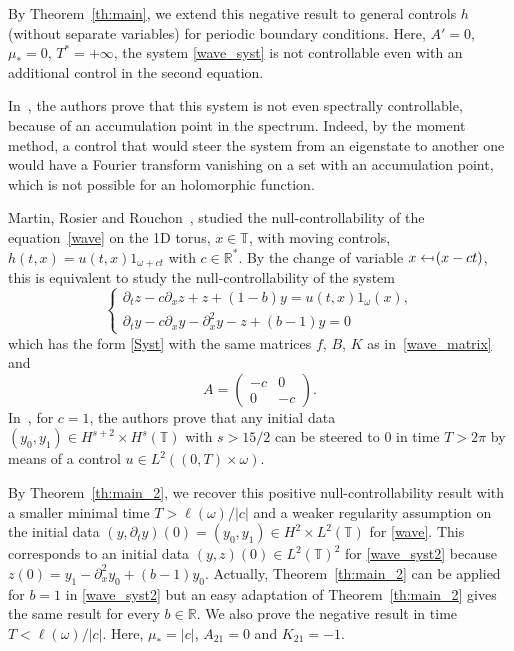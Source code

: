 \documentclass[10pt]{amsart}
\def\from{\mathchoice{\longleftarrow}{\leftarrow}{\leftarrow}{\leftarrow}}
\def\mfrom{\mathrel{\from\joinrel\mapstochar}}
\theoremstyle{plain}
\theoremstyle{definition}
\theoremstyle{remark}
\newcommand{\set}{\mathbb}
\newcommand{\R}{} %
\renewcommand{\R}{\set{R}}
\newcommand{\T}{\set{T}}
\begin{document}
By Theorem~\ref{th:main}, we extend this negative result to general controls $h$ (\ie without separate variables) for periodic boundary conditions.
Here, $A'=0$, $\mu_*=0$, $T^\ast=+\infty$, the system \eqref{wave_syst} is not controllable even with an additional control in the second equation.

In~\cite{rosier_2007}, the authors prove that this system is not even spectrally controllable, because of an accumulation point in the spectrum.
Indeed, by the moment method, a control that would steer the system from an eigenstate to another one would have a Fourier transform vanishing on a set with an accumulation point, which is not possible for an holomorphic function.

Martin, Rosier and Rouchon~\cite{martin_2013}, studied the null-controllability of the equation~\eqref{wave} on the 1D torus, $x\in\T$, with moving controls, \ie $h(t,x)=u(t,x) 1_{\omega+ct}$ with $c\in\R^*$.
By the change of variable $x \mfrom (x-ct)$, this is equivalent to study the null-controllability of the system
\begin{equation} \label{wave_syst2}
\begin{cases}
\partial_t z-c\partial_x z+z+(1-b)y= u(t,x) 1_{\omega}(x), \\
\partial_t y-c\partial_x y-\partial_x^2y -z + (b-1)y =0
\end{cases}
\end{equation}
which has the form \eqref{Syst} with the same matrices $f$, $B$, $K$ as in~\eqref{wave_matrix} and
\[
A=\begin{pmatrix}
-c & 0 \\ 0 & -c
\end{pmatrix}.
\]
In~\cite[Th.\,1.2]{martin_2013}, for $c\!=\!1$, the authors prove that any initial data \hbox{$(y_0,y_1)\!\in\! H^{s+2}\!\times\! H^{s}(\T)$} with $s>15/2$ can be steered to $0$ in time $T>2\pi$ by means of a control $u\in L^2((0,T)\times\omega)$.

By Theorem~\ref{th:main_2}, we recover this positive null-controllability result with a smaller minimal time $T>\ell(\omega)/|c|$ and a weaker regularity assumption on the initial data $(y,\partial_t y)(0)=(y_0,y_1)\in H^2 \times L^2(\T)$ for \eqref{wave}.
This corresponds to an initial data $(y,z)(0) \in L^2(\T)^2$ for \eqref{wave_syst2} because $z(0)=y_1-\partial_x^2 y_0 + (b-1)y_0$. Actually, Theorem~\ref{th:main_2} can be applied for $b=1$ in \eqref{wave_syst2} but an easy adaptation of Theorem~\ref{th:main_2} gives the same result for every $b \in \R$.
We also prove the negative result in time $T<\ell(\omega)/|c|$. Here, $\mu_*=|c|$, $A_{21}=0$ and $K_{21}=-1$.
\end{document}
